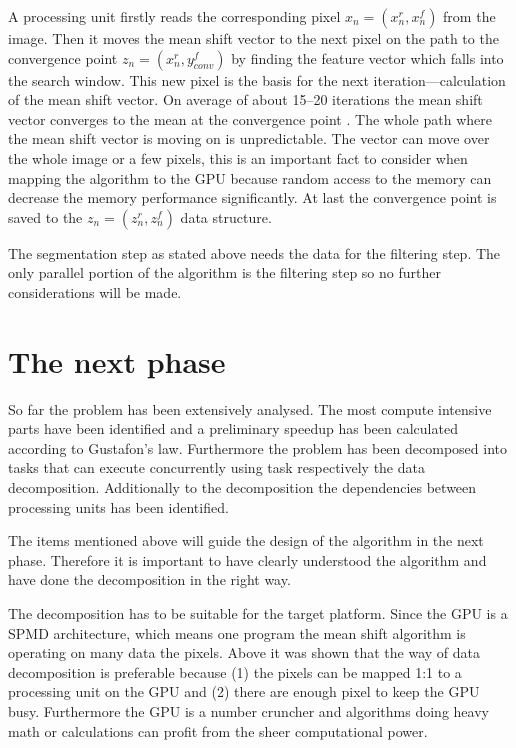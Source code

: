 A processing unit firstly reads the corresponding pixel $x_n = (x_n^r, x_n^f)$
from the image. Then it moves the mean shift vector to the next pixel on the
path to the convergence point $z_n = (x_n^r, y_{conv}^f)$ by finding the feature
vector which falls into the search window. This new pixel is the basis for the
next iteration---calculation of the mean shift vector. On average of about
15--20 iterations the mean shift vector converges to the mean at the convergence
point \citep{DBLP:conf/eccv/ZhangKT06}. The whole path where the mean shift
vector is moving on is unpredictable. The vector can move over the whole image
or a few pixels, this is an important fact to consider when mapping the
algorithm to the \gls{GPU} because random access to the memory can decrease the
memory performance significantly. At last the convergence point is saved to the
$z_n = (z_n^r, z_n^f)$ data structure.

The segmentation step as stated above needs the data for the filtering step. The
only parallel portion of the algorithm is the filtering step so no further 
considerations will be made. 

\section{The next phase} %
\label{sec:analysis_summary}
So far the problem has been extensively analysed. The most compute intensive
parts have been identified and a preliminary speedup has been calculated
according to Gustafon's law. Furthermore the problem has been decomposed into
tasks that can execute concurrently using task respectively the data
decomposition. Additionally to the decomposition the dependencies between
processing units has been identified. 

The items  mentioned above will guide the design of the algorithm in the next
phase. Therefore it is important to have clearly understood the algorithm and
have done the decomposition in the right way. 

The decomposition has to be suitable for the target platform. Since the
\gls{GPU} is a \gls{SPMD} architecture, which means one program the mean shift
algorithm is operating on many data the pixels. Above it was shown that the way
of data decomposition is preferable because (1) the pixels can be mapped 1:1 to
a processing unit on the \gls{GPU} and (2) there are enough pixel to keep the
\gls{GPU} busy. Furthermore the \gls{GPU} is a number cruncher and algorithms
doing heavy math or calculations can profit from the sheer computational power.

